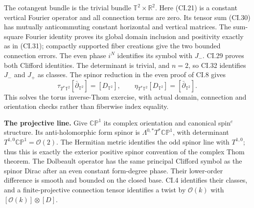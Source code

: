 \documentclass[
  11pt,
]{article}
\begin{document}
The cotangent bundle is the trivial bundle
\(\mathbb T^2\times\mathbb R^2\). Here (CI.21) is a constant vertical
Fourier operator and all connection terms are zero. Its tensor sum
(CI.30) has mutually anticommuting constant horizontal and vertical
matrices. The sum-square Fourier identity proves its global domain
inclusion and positivity exactly as in (CI.31); compactly supported
fiber creations give the two bounded connection errors. The even phase
\(i^N\) identifies its symbol with \(J_-\). CI.29 proves both Clifford
identities. The determinant is trivial, and \(n=2\), so CI.32 identifies
\(J_-\) and \(J_+\) as classes. The spinor reduction in the even proof
of CI.8 gives \[
 \tau_{T^*\mathbb T^2}[\bar\partial_{\mathbb T^2}]
       =[D_{\mathbb T^2}],\qquad
 \eta_{T^*\mathbb T^2}[D_{\mathbb T^2}]
       =[\bar\partial_{\mathbb T^2}].
\] This solves the torus inverse-Thom exercise, with actual domain,
connection and orientation checks rather than fiberwise index equality.

\textbf{The projective line.} Give \(\mathbb {CP}^1\) its complex
orientation and canonical spin\(^{c}\) structure. Its anti-holomorphic
form spinor is \(\Lambda^{0,*}T^*\mathbb {CP}^1\), with determinant
\(T^{1,0}\mathbb {CP}^1=\mathcal O(2)\). The Hermitian metric identifies
the odd spinor line with \(T^{1,0}\); thus this is exactly the exterior
positive spinor convention of the complex Thom theorem. The Dolbeault
operator has the same principal Clifford symbol as the spinor Dirac
after an even constant form-degree phase. Their lower-order difference
is smooth and bounded on the closed base. CI.4 identifies their classes,
and a finite-projective connection tensor identifies a twist by
\(\mathcal O(k)\) with \([\mathcal O(k)]\otimes[D]\).
\end{document}
